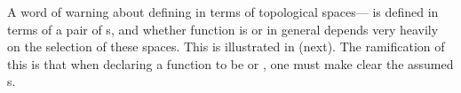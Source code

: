 %
%

\begin{remark}
\label{rem:conttop}
A word of warning about defining  in terms of topological spaces--- 
is defined in terms of a pair of s, and whether function is 
or  in general depends very heavily on the selection of these spaces. 
This is illustrated in  (next).
The ramification of this is that when declaring a function to be  or , 
one must make clear the assumed s.
\end{remark}

